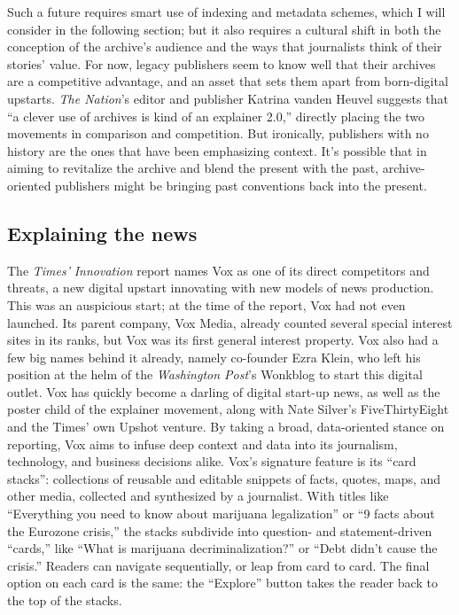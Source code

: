 Such a future requires smart use of indexing and metadata schemes, which I will consider in the following section; but it also requires a cultural shift in both the conception of the archive's audience and the ways that journalists think of their stories' value. For now, legacy publishers seem to know well that their archives are a competitive advantage, and an asset that sets them apart from born-digital upstarts. \emph{The Nation}'s editor and publisher Katrina vanden Heuvel suggests that ``a clever use of archives is kind of an explainer 2.0,'' directly placing the two movements in comparison and competition.\autocite{levy_time.com_2014} But ironically, publishers with no history are the ones that have been emphasizing context. It's possible that in aiming to revitalize the archive and blend the present with the past, archive-oriented publishers might be bringing past conventions back into the present.

\subsection{Explaining the news}

The \emph{Times'} \emph{Innovation} report names Vox as one of its direct competitors and threats, a new digital upstart innovating with new models of news production. This was an auspicious start; at the time of the report, Vox had not even launched. Its parent company, Vox Media, already counted several special interest sites in its ranks, but Vox was its first general interest property. Vox also had a few big names behind it already, namely co-founder Ezra Klein, who left his position at the helm of the \emph{Washington Post}'s Wonkblog to start this digital outlet. Vox has quickly become a darling of digital start-up news, as well as the poster child of the explainer movement, along with Nate Silver's FiveThirtyEight and the Times' own Upshot venture. By taking a broad, data-oriented stance on reporting, Vox aims to infuse deep context and data into its journalism, technology, and business decisions alike. Vox's signature feature is its ``card stacks'': collections of reusable and editable snippets of facts, quotes, maps, and other media, collected and synthesized by a journalist. With titles like ``Everything you need to know about marijuana legalization'' or ``9 facts about the Eurozone crisis,'' the stacks subdivide into question- and statement-driven ``cards,'' like ``What is marijuana decriminalization?'' or ``Debt didn't cause the crisis.'' Readers can navigate sequentially, or leap from card to card. The final option on each card is the same: the ``Explore'' button takes the reader back to the top of the stacks.

